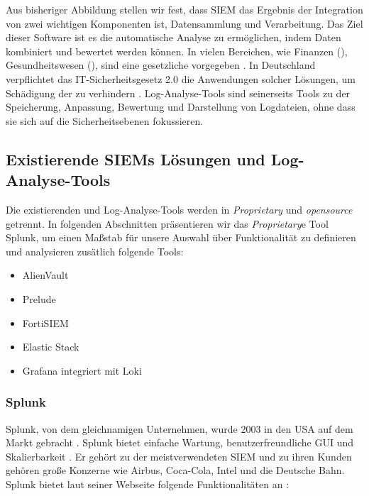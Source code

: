Aus bisheriger Abbildung stellen wir fest, dass \gls{SIEM} das Ergebnis der Integration von zwei wichtigen Komponenten ist, Datensammlung und Verarbeitung. Das Ziel dieser Software ist es die automatische Analyse zu ermöglichen, indem Daten kombiniert und bewertet werden können. In vielen Bereichen, wie Finanzen (), Gesundheitswesen (), sind  eine gesetzliche vorgegeben \citep{Jog_SIEM}. In Deutschland verpflichtet das \gls{IT-Sicherheitsgesetz 2.0} die Anwendungen solcher Lösungen, um Schädigung der  zu verhindern \citep{BSI_ITSG}. Log-Analyse-Tools sind seinerseits Tools zu der Speicherung, Anpassung, Bewertung und Darstellung von Logdateien, ohne dass sie sich auf die Sicherheitsebenen fokussieren.

\subsection{Existierende SIEMs Lösungen und Log-Analyse-Tools}
Die existierenden  und Log-Analyse-Tools werden in \textit{\gls{Proprietary}} und \textit{\gls{opensource}} getrennt. In folgenden Abschnitten präsentieren wir das \textit{\gls{Proprietary}}e Tool Splunk, um einen Maßstab für unsere Auswahl über Funktionalität zu definieren und analysieren zusätlich folgende Tools: %

\begin{itemize}[noitemsep]
   \item AlienVault  %
   \item Prelude %
   \item FortiSIEM %
   \item Elastic Stack %
   \item Grafana integriert mit Loki %
\end{itemize}

\subsubsection{Splunk}
Splunk, von dem gleichnamigen Unternehmen, wurde 2003 in den USA auf dem Markt gebracht \citep{Splunk_splunk}. Splunk bietet einfache Wartung, benutzerfreundliche \gls{GUI} und Skalierbarkeit \citep{Kazarov_Splunk}. Er gehört zu der meistverwendeten \gls{SIEM} und zu ihren Kunden gehören große Konzerne wie Airbus, Coca-Cola, Intel und die Deutsche Bahn. Splunk bietet laut seiner Webseite folgende Funktionalitäten an \citep{Splunk_SPE}:

